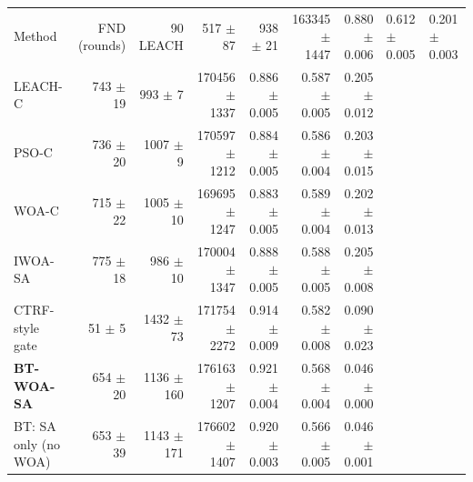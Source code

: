 \begin{tabular}{lrrrrrr}
\toprule
Method & FND (rounds) & 90 %
\midrule
LEACH & 517 $\pm$ 87 & 938 $\pm$ 21 & 163345 $\pm$ 1447 & 0.880 $\pm$ 0.006 & 0.612 $\pm$ 0.005 & 0.201 $\pm$ 0.003 \\
LEACH-C & 743 $\pm$ 19 & 993 $\pm$ 7 & 170456 $\pm$ 1337 & 0.886 $\pm$ 0.005 & 0.587 $\pm$ 0.005 & 0.205 $\pm$ 0.012 \\
PSO-C & 736 $\pm$ 20 & 1007 $\pm$ 9 & 170597 $\pm$ 1212 & 0.884 $\pm$ 0.005 & 0.586 $\pm$ 0.004 & 0.203 $\pm$ 0.015 \\
WOA-C & 715 $\pm$ 22 & 1005 $\pm$ 10 & 169695 $\pm$ 1247 & 0.883 $\pm$ 0.005 & 0.589 $\pm$ 0.004 & 0.202 $\pm$ 0.013 \\
IWOA-SA & 775 $\pm$ 18 & 986 $\pm$ 10 & 170004 $\pm$ 1347 & 0.888 $\pm$ 0.005 & 0.588 $\pm$ 0.005 & 0.205 $\pm$ 0.008 \\
CTRF-style gate & 51 $\pm$ 5 & 1432 $\pm$ 73 & 171754 $\pm$ 2272 & 0.914 $\pm$ 0.009 & 0.582 $\pm$ 0.008 & 0.090 $\pm$ 0.023 \\
\textbf{BT-WOA-SA} & 654 $\pm$ 20 & 1136 $\pm$ 160 & 176163 $\pm$ 1207 & 0.921 $\pm$ 0.004 & 0.568 $\pm$ 0.004 & 0.046 $\pm$ 0.000 \\
BT: SA only (no WOA) & 653 $\pm$ 39 & 1143 $\pm$ 171 & 176602 $\pm$ 1407 & 0.920 $\pm$ 0.003 & 0.566 $\pm$ 0.005 & 0.046 $\pm$ 0.001 \\
\bottomrule
\end{tabular}